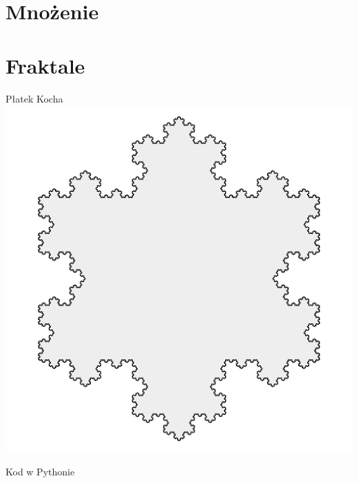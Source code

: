 \section{Mnożenie}\label{sec:multiplication}



\section{Fraktale}\label{sec:fractals}
\begin{frame}{Płatek Kocha}
    \centering
    \includegraphics[height=0.8\textheight]{recursion/graphics/koch_snowflake.png}
\end{frame}
\begin{frame}{Kod w Pythonie}
    
    
\end{frame}


